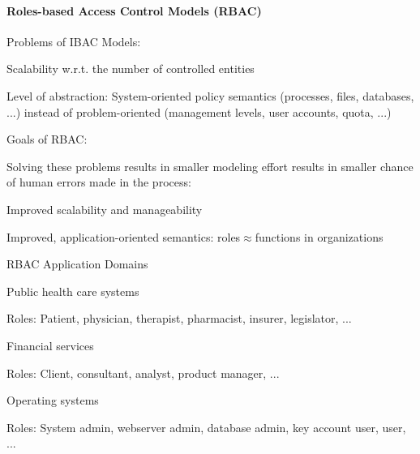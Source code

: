 \documentclass[a4paper]{article}
\begin{document}
\begin{multicols}{3}
    \paragraph{Roles-based Access Control Models (RBAC)}

    Problems of IBAC Models:
    \begin{itemize*}
        \item Scalability w.r.t. the number of controlled entities
        \item Level of abstraction: System-oriented policy semantics (processes, files, databases, ...) instead of problem-oriented (management levels, user accounts, quota, ...)
    \end{itemize*}

    Goals of RBAC:
    \begin{itemize*}
        \item Solving these problems results in smaller modeling effort results in smaller chance of human errors made in the process:
        \begin{itemize*}
            \item Improved scalability and manageability
            \item Improved, application-oriented semantics: roles$\approx$functions in organizations
        \end{itemize*}
    \end{itemize*}

    RBAC Application Domains
    \begin{itemize*}
        \item Public health care systems
        \begin{itemize*}
            \item Roles: Patient, physician, therapist, pharmacist, insurer, legislator, ...
        \end{itemize*}
        \item Financial services
        \begin{itemize*}
            \item Roles: Client, consultant, analyst, product manager, ...
        \end{itemize*}
        \item Operating systems
        \begin{itemize*}
            \item Roles: System admin, webserver admin, database admin, key account user, user, ...
        \end{itemize*}
    \end{itemize*}


\end{multicols}
\end{document}
